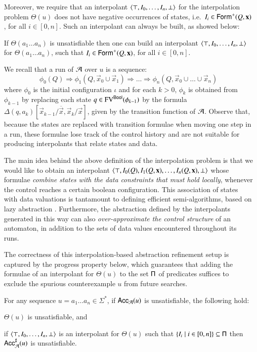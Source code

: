 \documentclass[10pt,conference,letterpaper,twocolumn]{IEEEtran}
\begin{document}
Moreover, we require that an interpolant
$\left\langle \top,I_0,\ldots,I_n,\bot \right\rangle$ for the interpolation problem
$\Theta(u)$ does not have negative occurrences of states, i.e.\ $I_i
\in \mathsf{Form}^+(Q,\mathbf x)$, for all $i \in [0,n]$. Such an interpolant
can always be built, as showed below:

\begin{proposition}\label{prop:positive-interpol}
  If $\Theta(a_1 \ldots a_n)$ is unsatisfiable then one can build an
  interpolant $\left\langle \top,I_0,\ldots,I_n,\bot \right\rangle$ for $\Theta(a_1\ldots
  a_n)$, such that $I_i \in \mathsf{Form}^+(Q,\mathbf x)$, for all $i \in
  [0,n]$.
\end{proposition}

We recall that a run of $\mathcal{A}$ over $u$ is a sequence: \[\phi_0(Q)
\Rightarrow \phi_1(Q,\vec{x}_0\cup\vec{x}_1) \Rightarrow \ldots
\Rightarrow \phi_n(Q,\vec{x}_0\cup\ldots\cup\vec{x}_n)\] where
$\phi_0$ is the initial configuration $\iota$ and for each $k>0$,
$\phi_k$ is obtained from $\phi_{k-1}$ by replacing each state $q \in
\mathrm{FV}^{\mathsf{Bool}}(\phi_{k-1})$ by the formula
$\Delta(q,a_k)[\vec{x}_{k-1}/\overline{\vec{x}},\vec{x}_k/\vec{x}]$,
given by the transition function of $\mathcal{A}$. Observe that, because the
states are replaced with transition formulae when moving one step in a
run, these formulae lose track of the control history and are not
suitable for producing interpolants that relate states and data.

The main idea behind the above definition of the interpolation problem
is that we would like to obtain an interpolant $\left\langle \top,I_0(Q),
  I_1(Q,\mathbf x), \ldots, I_{n}(Q,\mathbf x),\bot \right\rangle$ whose formulae
\emph{combine states with the data constraints that must hold
  locally}, whenever the control reaches a certain boolean
configuration. This association of states with data valuations is
tantamount to defining efficient semi-algorithms, based on lazy
abstraction \cite{HJMS02}. Furthermore, the abstraction defined by the
interpolants generated in this way can also \emph{over-approximate the
  control structure} of an automaton, in addition to the sets of data
values encountered throughout its runs.

The correctness of this interpolation-based abstraction refinement
setup is captured by the progress property below, which guarantees
that adding the formulae of an interpolant for $\Theta(u)$ to the set
$\mathsf{\Pi}$ of predicates suffices to exclude the spurious counterexample
$u$ from future searches.

\begin{lemma}\label{lemma:progress}
  For any sequence $u = a_1\ldots a_n \in \Sigma^*$, if
  $\mathsf{Acc}_{\mathcal{A}}(u)$ is unsatisfiable, the following
  hold: \begin{compactenum}
  \item\label{it1:progress} $\Theta(u)$ is unsatisfiable, and
  \item\label{it2:progress} if $\left\langle \top,I_0,\dots,I_{n},\bot \right\rangle$ is
    an interpolant for $\Theta(u)$ such that $\left\{ I_i \mid i
      \in[0,n] \right\} \subseteq \mathsf{\Pi}$ then ${\mathsf{Acc}}^\sharp_{\mathcal{A}}(u)$ is
    unsatisfiable.
  \end{compactenum}
\end{lemma}
\end{document}
